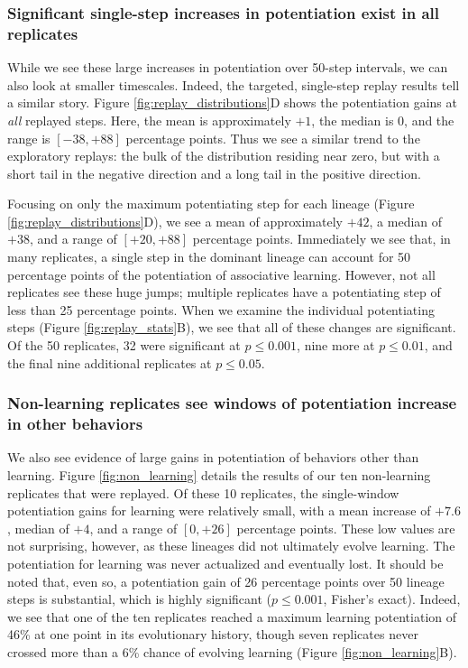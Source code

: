 \subsubsection{Significant single-step increases in potentiation exist in all replicates}

While we see these large increases in potentiation over 50-step intervals, we can also look at smaller timescales. 
Indeed, the targeted, single-step replay results tell a similar story. 
Figure \ref{fig:replay_distributions}D shows the potentiation gains at \textit{all} replayed steps.
Here, the mean is approximately $+1$, the median is 0, and the range is $[-38, +88]$ percentage points. 
Thus we see a similar trend to the exploratory replays: the bulk of the distribution residing near zero, but with a short tail in the negative direction and a long tail in the positive direction. 

Focusing on only the maximum potentiating step for each lineage (Figure \ref{fig:replay_distributions}D), we see a mean of approximately $+42$, a median of $+38$, and a range of $[+20, +88]$ percentage points. 
Immediately we see that, in many replicates, a single step in the dominant lineage can account for 50 percentage points of the potentiation of associative learning. 
However, not all replicates see these huge jumps; multiple replicates have a potentiating step of less than 25 percentage points. 
When we examine the individual potentiating steps (Figure \ref{fig:replay_stats}B), we see that all of these changes are significant. 
Of the 50 replicates, 32 were significant at $p \leq 0.001$, nine more at $p \leq 0.01$, and the final nine additional replicates at $p \leq 0.05$. 

\subsubsection{Non-learning replicates see windows of potentiation increase in other behaviors}

We also see evidence of large gains in potentiation of behaviors other than learning. 
Figure \ref{fig:non_learning} details the results of our ten non-learning replicates that were replayed. 
Of these 10 replicates, the single-window potentiation gains for learning were relatively small, with a mean increase of $+7.6$, median of $+4$, and a range of $[0, +26]$ percentage points.
These low values are not surprising, however, as these lineages did not ultimately evolve learning. 
The potentiation for learning was never actualized and eventually lost. 
It should be noted that, even so, a potentiation gain of 26 percentage points over 50 lineage steps is substantial, which is highly significant ($p \leq 0.001$, Fisher's exact). 
Indeed, we see that one of the ten replicates reached a maximum learning potentiation of 46\% at one point in its evolutionary history, though seven replicates never crossed more than a 6\% chance of evolving learning (Figure \ref{fig:non_learning}B).

